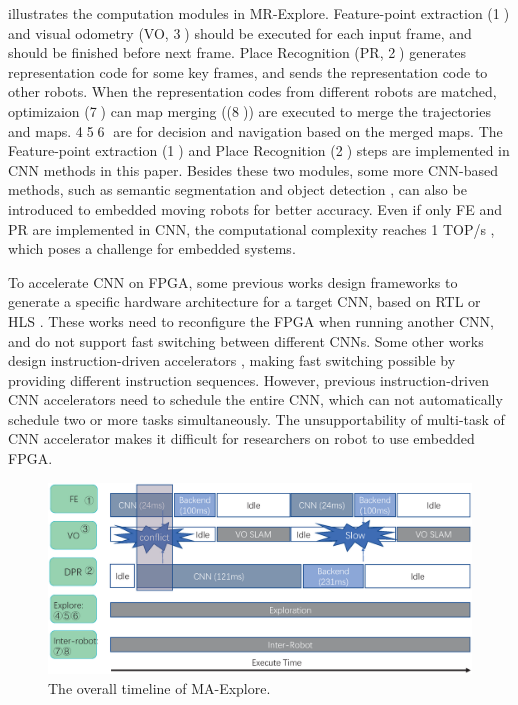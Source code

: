  illustrates the computation modules in MR-Explore. Feature-point extraction (\textcircled{1}) and visual odometry (VO, \textcircled{3}) should be executed for each input frame, and should be finished before next frame. 
Place Recognition (PR, \textcircled{2}) generates representation code for some key frames, and sends the representation code to other robots. 
When the  representation codes from different robots are matched, optimizaion (\textcircled{7}) can map merging ((\textcircled{8})) are executed to merge the trajectories and maps. \textcircled{4}\textcircled{5}\textcircled{6} are for decision and navigation based on the merged maps. 
The Feature-point extraction (\textcircled{1}) and  Place Recognition (\textcircled{2}) steps are implemented in CNN methods in this paper.
Besides these two modules, some more CNN-based methods, such as semantic segmentation \cite{long2015fully} and object detection \cite{ren2015faster}, can also be introduced to embedded moving robots for better accuracy.
Even if only FE and PR are implemented in CNN, the computational complexity reaches 1 TOP/s , which poses a challenge for embedded systems.

To accelerate CNN on FPGA, some previous works design frameworks to generate a specific hardware architecture for a target CNN, based on  RTL \cite{li_high_2016} or HLS \cite{lu_evaluating_2017}. These works need to reconfigure the FPGA when running another CNN, and do not support fast switching between different CNNs. Some other works design instruction-driven accelerators \cite{yu2018instruction,qiu2016going}, making fast switching possible by providing different instruction sequences. However, previous instruction-driven CNN accelerators need to schedule the entire CNN, which can not automatically schedule two or more tasks simultaneously. The unsupportability of multi-task of CNN accelerator makes it difficult for researchers on robot to use embedded FPGA.


\begin{figure}
	\centering
	\includegraphics[width=0.99\linewidth]{fig/overalltime.eps}
    \caption{
    The overall timeline of MA-Explore.
    }
	\label{fig:overalltime}
\end{figure}

